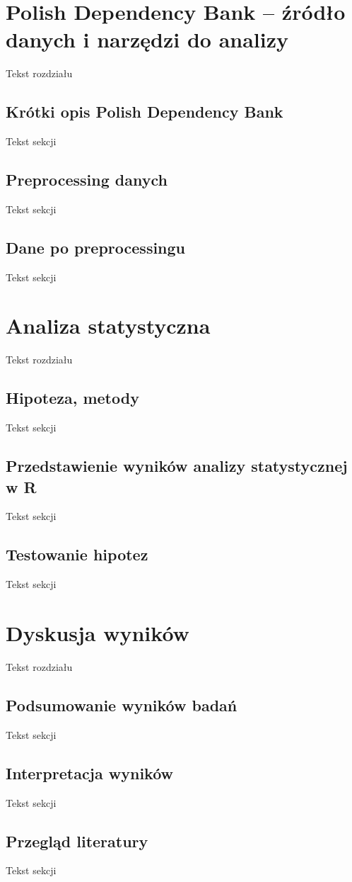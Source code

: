 \documentclass[licencjacka]{pracamgr}
\begin{document}
\chapter{Polish Dependency Bank -- źródło danych i narzędzi do analizy}
Tekst rozdziału
\section{Krótki opis Polish Dependency Bank}
Tekst sekcji
\section{Preprocessing danych}
Tekst sekcji
\section{Dane po preprocessingu}
Tekst sekcji

\chapter{Analiza statystyczna}
Tekst rozdziału
\section{Hipoteza, metody}
Tekst sekcji
\section{Przedstawienie wyników analizy statystycznej w R}
Tekst sekcji
\section{Testowanie hipotez}
Tekst sekcji

\chapter{Dyskusja wyników}
Tekst rozdziału
\section{Podsumowanie wyników badań}
Tekst sekcji
\section{Interpretacja wyników}
Tekst sekcji
\section{Przegląd literatury}
Tekst sekcji
\end{document}
